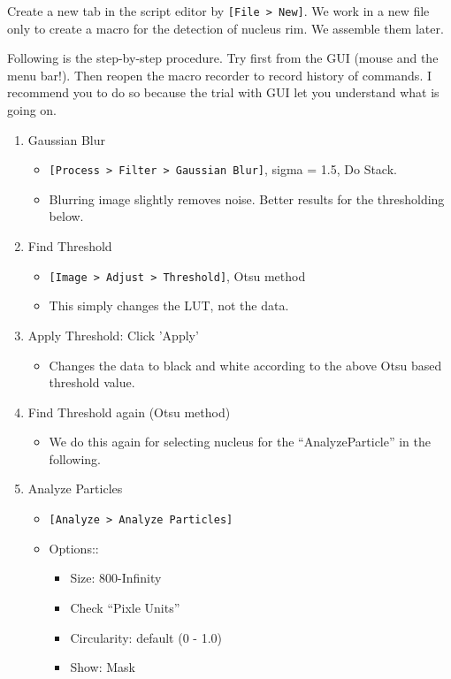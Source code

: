 \documentclass[11pt,a4paper,oneside]{report}
\newcommand{\ijmenu}[1]{\texttt{\small#1}}
\newcommand{\ilcom}[1]{\texttt{\small#1}}
\begin{document}
Create a new tab in the script editor by \ilcom{[File > New]}. We work in a new file only to create a macro for the detection of nucleus rim. We assemble them later. 

Following is the step-by-step procedure. Try first from the GUI (mouse and the menu bar!). Then reopen the macro recorder to record history of commands. I recommend you to do so because the trial with GUI let you understand what is going on.  

\begin{enumerate}
  \item Gaussian Blur
  \begin{itemize}
    \item \ijmenu{[Process > Filter > Gaussian Blur]}, sigma = 1.5, Do Stack.
    \item Blurring image slightly removes noise. Better results for the thresholding below.  
  \end{itemize}
  \item Find Threshold
  \begin{itemize}
    \item \ijmenu{[Image > Adjust > Threshold]},  Otsu method
    \item This simply changes the LUT, not the data. 
  \end{itemize}
  \item Apply Threshold: Click 'Apply'
  \begin{itemize}
    \item Changes the data to black and white according to the above Otsu based threshold value. 
  \end{itemize}
  \item Find Threshold again (Otsu method)
  \begin{itemize}
    \item We do this again for selecting nucleus for the ``AnalyzeParticle'' in the following.
  \end{itemize}
  \item Analyze Particles
  \begin{itemize}
    \item \ijmenu{[Analyze > Analyze Particles]}
    \item Options::
    \begin{itemize}
      \item Size: 800-Infinity
      \item Check ``Pixle Units''
      \item Circularity: default (0 - 1.0)
      \item Show: Mask

\end{itemize}
\end{itemize}
\end{enumerate}
\end{document}
